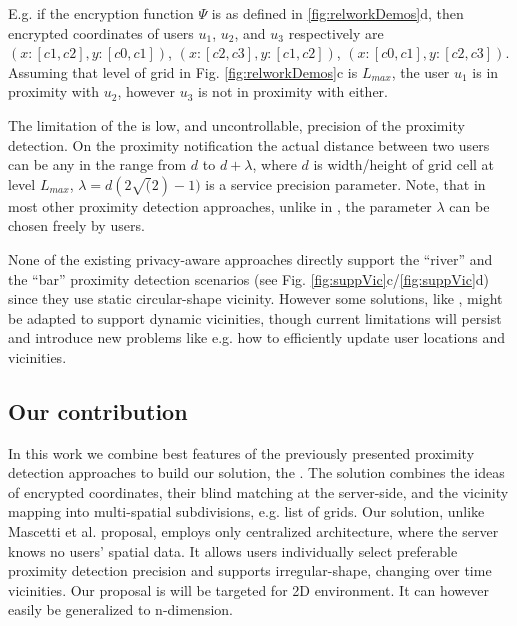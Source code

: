 E.g. if the encryption function $\Psi$ is as defined in
\ref{fig:relworkDemos}d, then encrypted coordinates of users $u_1$, $u_2$, and
$u_3$ respectively are $(x:[c1,c2],y:[c0,c1])$, $(x:[c2,c3],y:[c1,c2])$,
$(x:[c0,c1],y:[c2,c3])$. Assuming that level of grid in Fig.
\ref{fig:relworkDemos}c is $L_{max}$, the user $u_1$ is in proximity with $u_2$,
however $u_3$ is not in proximity with either.



The limitation of the \ff is low, and uncontrollable, precision of the
proximity detection. On the proximity notification the actual distance between
two users can be any in the range from $d$ to $d + \lambda$, 
where $d$ is width/height of grid cell at level $L_{max}$, 
$\lambda = d(2\sqrt(2) - 1)$ is a service precision parameter. Note, 
that in most other proximity detection approaches, unlike in \ff, the parameter 
$\lambda$ can be chosen freely by users. 

None of the existing privacy-aware approaches directly support the ``river'' 
and the ``bar'' proximity detection scenarios (see Fig. 
\ref{fig:suppVic}c/\ref{fig:suppVic}d) since they use static circular-shape vicinity. 
However some solutions, like \hc \cite{pbsPaper}, might be adapted to support dynamic 
vicinities, though current limitations will persist and introduce new problems 
like e.g. how to efficiently update user locations and vicinities.




\subsection{Our contribution}

In this work we combine best features of the previously presented proximity
detection approaches to build our solution, the \vl. The solution combines the
ideas of encrypted coordinates, their blind matching at the server-side, and
the vicinity mapping into multi-spatial subdivisions, e.g. list of grids.
Our solution, unlike Mascetti et al. \cite{pbsPaper} proposal, employs only
centralized architecture, where the server knows no users' spatial data. It
allows users individually select preferable proximity detection precision and 
supports irregular-shape, changing over time vicinities. Our proposal
is will be targeted for 2D environment.
It can however easily be generalized to n-dimension.

